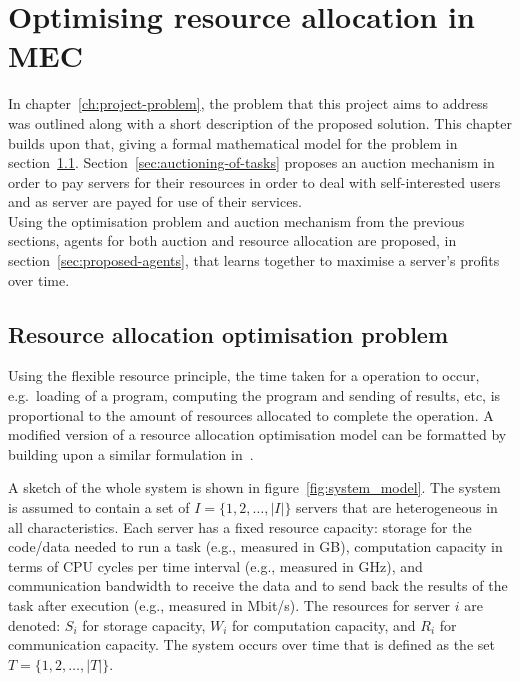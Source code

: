 
\chapter{Optimising resource allocation in MEC}\label{ch:proposed-solution}
In chapter~\ref{ch:project-problem}, the problem that this project aims to address was outlined along with a short
description of the proposed solution. This chapter builds upon that, giving a formal mathematical model for the problem
in section~\ref{sec:optimisation-problem}. Section~\ref{sec:auctioning-of-tasks} proposes an auction mechanism in order
to pay servers for their resources in order to deal with self-interested users and as server are payed for use of their
services. \\
Using the optimisation problem and auction mechanism from the previous sections, agents for both auction and resource
allocation are proposed, in section~\ref{sec:proposed-agents}, that learns together to maximise a server's profits
over time.

\section{Resource allocation optimisation problem}\label{sec:optimisation-problem}
Using the flexible resource principle, the time taken for a operation to occur, e.g.\ loading of a program, computing
the program and sending of results, etc, is proportional to the amount of resources allocated to complete the operation.
A modified version of a resource allocation optimisation model can be formatted by building upon a similar formulation
in~\cite{FlexibleResourceAllocation}.

A sketch of the whole system is shown in figure~\ref{fig:system_model}.
The system is assumed to contain a set of $I = \{1,2,\ldots,\left|I\right|\}$ servers that are heterogeneous in all
characteristics. Each server has a fixed resource capacity: storage for the code/data needed to run a task
(e.g., measured in GB), computation capacity in terms of CPU cycles per time interval (e.g., measured in GHz),
and communication bandwidth to receive the data and to send back the results of the task after execution
(e.g., measured in Mbit/s). The resources for server $i$ are denoted: $S_i$ for storage capacity, $W_i$ for computation
capacity, and $R_i$ for communication capacity. The system occurs over time that is defined as the set
$T = \{1,2,\ldots,\left|T\right|\}$.

